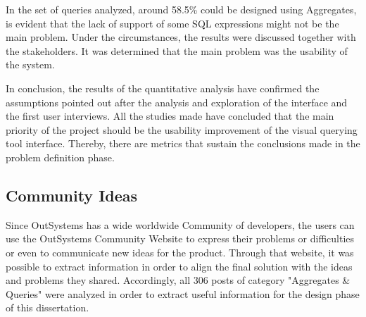 \begin{table}[tb]
	\caption{Queries that could be designed using Aggregates and the queries which the tool does not support}
	\label{tab:aggregates_supported_vs_not_supported_stats}
\centering
{}
\end{table}

In the set of queries analyzed, around 58.5\% could be designed using Aggregates, is evident that the lack of support of some \gls{SQL} expressions might not be the main problem. Under the circumstances, the results were discussed together with the stakeholders. It was determined that the main problem was the usability of the system. 

In conclusion, the results of the quantitative analysis have confirmed the assumptions pointed out after the analysis and exploration of the interface and the first user interviews. All the studies made have concluded that the main priority of the project should be the usability improvement of the visual querying tool interface. Thereby, there are metrics that sustain the conclusions made in the problem definition phase.

\subsection{Community Ideas}
\label{subsec:community_ideas}

Since OutSystems has a wide worldwide Community of developers, the users can use the OutSystems Community Website \cite{outsystems_community} to express their problems or difficulties or even to communicate new ideas for the product. Through that website, it was possible to extract information in order to align the final solution with the ideas and problems they shared. Accordingly, all 306 posts of category "Aggregates \& Queries" were analyzed in order to extract useful information for the design phase of this dissertation.

